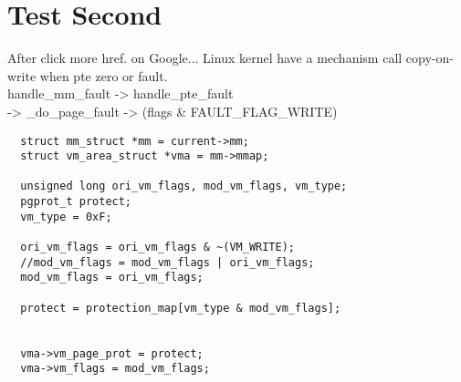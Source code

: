   
\section{Test Second}

	After click more href. on Google... Linux kernel have a mechanism call copy-on-write when pte zero or fault.   \\
	
	handle\_mm\_fault -> handle\_pte\_fault \\
	-> \_do\_page\_fault -> (flags \& FAULT\_FLAG\_WRITE)

	  \begin{verbatim}	
  struct mm_struct *mm = current->mm;
  struct vm_area_struct *vma = mm->mmap;

  unsigned long ori_vm_flags, mod_vm_flags, vm_type;
  pgprot_t protect;
  vm_type = 0xF;

  ori_vm_flags = ori_vm_flags & ~(VM_WRITE);
  //mod_vm_flags = mod_vm_flags | ori_vm_flags;
  mod_vm_flags = ori_vm_flags;

  protect = protection_map[vm_type & mod_vm_flags];


  vma->vm_page_prot = protect;
  vma->vm_flags = mod_vm_flags;
	  \end{verbatim}
